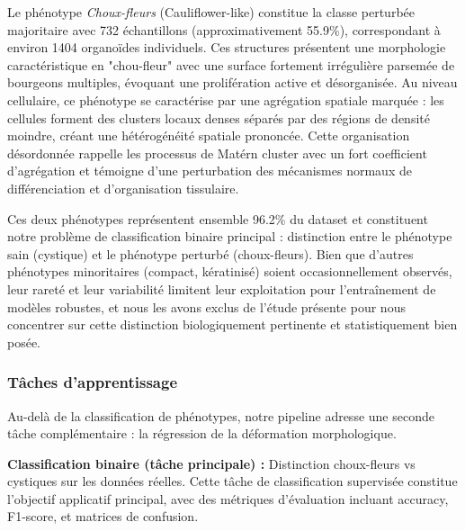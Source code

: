 Le phénotype \textit{Choux-fleurs} (Cauliflower-like) constitue la classe perturbée majoritaire avec 732 échantillons (approximativement 55.9\%), correspondant à environ 1404 organoïdes individuels. Ces structures présentent une morphologie caractéristique en "chou-fleur" avec une surface fortement irrégulière parsemée de bourgeons multiples, évoquant une prolifération active et désorganisée. Au niveau cellulaire, ce phénotype se caractérise par une agrégation spatiale marquée : les cellules forment des clusters locaux denses séparés par des régions de densité moindre, créant une hétérogénéité spatiale prononcée. Cette organisation désordonnée rappelle les processus de Matérn cluster avec un fort coefficient d'agrégation et témoigne d'une perturbation des mécanismes normaux de différenciation et d'organisation tissulaire.

Ces deux phénotypes représentent ensemble 96.2\% du dataset et constituent notre problème de classification binaire principal : distinction entre le phénotype sain (cystique) et le phénotype perturbé (choux-fleurs). Bien que d'autres phénotypes minoritaires (compact, kératinisé) soient occasionnellement observés, leur rareté et leur variabilité limitent leur exploitation pour l'entraînement de modèles robustes, et nous les avons exclus de l'étude présente pour nous concentrer sur cette distinction biologiquement pertinente et statistiquement bien posée.

\subsubsection{Tâches d'apprentissage}

Au-delà de la classification de phénotypes, notre pipeline adresse une seconde tâche complémentaire : la régression de la déformation morphologique.

\textbf{Classification binaire (tâche principale) :}
Distinction choux-fleurs vs cystiques sur les données réelles. Cette tâche de classification supervisée constitue l'objectif applicatif principal, avec des métriques d'évaluation incluant accuracy, F1-score, et matrices de confusion.


